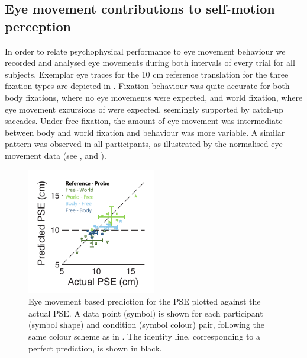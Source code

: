 \subsection{Eye movement contributions to self-motion perception}

In order to relate psychophysical performance to eye movement behaviour we recorded and analysed eye movements during both intervals of every trial for all subjects. Exemplar eye traces for the 10 \si{\centi\metre} reference translation for the three fixation types are depicted in . Fixation behaviour was quite accurate for both body fixations, where no eye movements were expected, and world fixation, where eye movement excursions of  were expected, seemingly supported by  catch-up saccades. Under free fixation, the amount of eye movement was intermediate between body and world fixation and behaviour was more variable. A similar pattern was observed in all participants, as illustrated by the normalised eye movement data (see , and ).

\begin{figure}
    \includegraphics[width=0.5\textwidth]{src/paper3/figure4.pdf}

    \caption{Eye movement based prediction for the PSE plotted against the actual PSE.  A data point (symbol) is shown for each participant (symbol shape) and condition (symbol colour) pair, following the same colour scheme as in . The identity line, corresponding to a perfect prediction, is shown in black.}
    \label{p3:fig4}
\end{figure}

